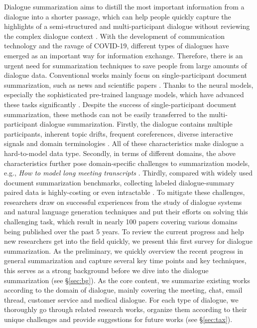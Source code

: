 

Dialogue summarization aims to distill the most important information from a dialogue into a shorter passage, which can help people quickly capture the highlights of a semi-structured and multi-participant dialogue without reviewing the complex dialogue context . With the development of communication technology and the ravage of COVID-19, different types of dialogues have emerged as an important way for information exchange. Therefore, there is an urgent need for summarization techniques to save people from large amounts of dialogue data.  
Conventional works mainly focus on single-participant document summarization, such as news and scientific papers .
Thanks to the neural models, especially the sophisticated pre-trained language models, which have advanced these tasks significantly .
Despite the success of single-participant document summarization, these methods can not be easily transferred to the multi-participant dialogue summarization.
Firstly, the dialogue contains multiple participants, inherent topic drifts, frequent coreferences, diverse interactive signals and domain terminologies . All of these characteristics make dialogue a hard-to-model data type.
Secondly, in terms of different domains, the above characteristics further pose domain-specific challenges to summarization models, e.g., \textit{How to model long meeting transcripts} .
Thirdly, compared with widely used document summarization benchmarks, collecting labeled dialogue-summary paired data is highly-costing or even intractable . 
To mitigate these challenges, researchers draw on successful experiences from the study of dialogue systems and natural language generation techniques and put their efforts on solving this challenging task, which result in nearly 100 papers covering various domains being published over the past 5 years.
To review the current progress and help new researchers get into the field quickly, we present this first survey for dialogue summarization.
As the preliminary, we quickly overview the recent progress in general summarization and capture several key time points and key techniques, this serves as a strong background before we dive into the dialogue summarization (see \S\ref{sec:bg}).
As the core content, we summarize existing works according to the domain of dialogue, mainly covering the meeting, chat, email thread, customer service and medical dialogue. 
For each type of dialogue, we thoroughly go through related research works, organize them according to their unique challenges and provide suggestions for future works (see \S\ref{sec:tax}). 

